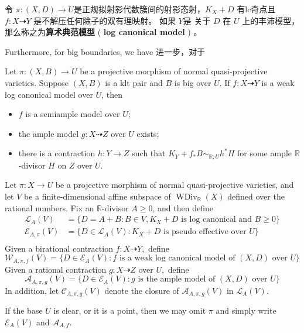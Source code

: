 \begin{definition}
	令 $ \pi:(X, D)\to U $是正规拟射影代数簇间的射影态射，$ K_X+D $ 有lc奇点且$ f: X\dashrightarrow Y $ 是不解压任何除子的双有理映射。 如果 $ Y $是 关于 $D$ 在 $U$ 上的丰沛模型，那么称之为\textbf{算术典范模型} ( \textbf{log canonical model} ) 。
\end{definition}

Furthermore, for big boundaries, we have
进一步，对于
\begin{lemma}\cite[lemmama 3.9.3]{BCHM10} Let $ \pi:(X,B)\to U $ be a projective morphism of normal quasi-projective varieties. Suppose $(X, B)$ is a klt pair and  $B$ is big over $U$. If $f:X\dashrightarrow Y$ is a weak log canonical model over $U$, then
	\begin{itemize}
		\item $f$ is a semiample model over $U$;
		\item  the ample model $g:X \dashrightarrow Z$ over $U$ exists;
		\item  there is a contraction $h:Y\to Z$ such that $K_{Y}+f_*B\sim_{\mathbb{R},U} h^*H$ for some ample $\mathbb{R}$-divisor $H$ on $Z$ over $U$.
	\end{itemize}
\end{lemma}

\begin{definition}\label{polytopeofdivisor}
	\cite[Definition 1.1.4]{BCHM10} Let $ \pi: X\to U $ be a projective morphism of normal quasi-projective varieties, and let $ V $ be a finite-dimensional affine subspace of $ \operatorname{WDiv}_{\mathbb{R}}(X) $ defined over the rational numbers. Fix an $ \mathbb{R} $-divisor $ A\geqslant 0 $, and then define
	\[
		\begin{aligned}
			\mathcal{L}_A(V)       & =\{D=A+B:B \in V,  K_X+D \text{ is log canonical and  } B\geqslant0 \} \\
			\mathcal{E}_{A,\pi}(V) & =\{D\in \mathcal{L}_A(V): K_X+D \text{ is pseudo effective over } U\}  \\
		\end{aligned}
	\]
	Given a birational contraction $ f:X \dashrightarrow Y,$ define
	\[ \mathcal{W}_{A,\pi,f}(V)=\{D\in \mathcal{E}_{A}(V): f \text{ is a weak log canonical model of  } (X,D) \text{ over }U\} \]
	Given a rational contraction $g:X\dashrightarrow Z  $ over $ U, $ define
	\[ \mathcal{A}_{A,\pi,g}(V)=\{D\in \mathcal{E}_{A}(V): g \text{ is the ample model of  } (X,D) \text{ over }U\} \]
	In addition, let $ \mathcal{C}_{A,\pi,g}(V) $ denote the closure of $ \mathcal{A}_{A,\pi,g}(V) $ in $\mathcal{L}_{A}(V)$.

	If the base $U$ is clear, or it is a point, then we may omit $\pi$ and simply write $\mathcal{E}_{A}(V)$ and $\mathcal{A}_{A,f}$.
\end{definition}

